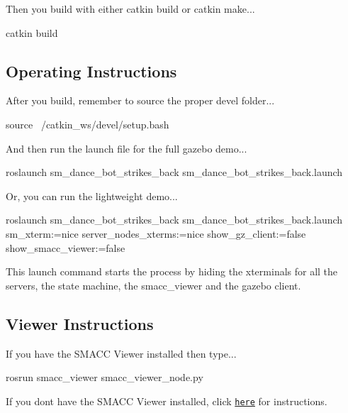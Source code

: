 Then you build with either catkin build or catkin make...


\begin{DoxyCode}
catkin build
\end{DoxyCode}
 \subsection*{Operating Instructions}

After you build, remember to source the proper devel folder...


\begin{DoxyCode}
source ~/catkin\_ws/devel/setup.bash
\end{DoxyCode}


And then run the launch file for the full gazebo demo...


\begin{DoxyCode}
roslaunch sm\_dance\_bot\_strikes\_back sm\_dance\_bot\_strikes\_back.launch
\end{DoxyCode}


Or, you can run the lightweight demo...


\begin{DoxyCode}
roslaunch sm\_dance\_bot\_strikes\_back sm\_dance\_bot\_strikes\_back.launch sm\_xterm:=nice
       server\_nodes\_xterms:=nice show\_gz\_client:=false show\_smacc\_viewer:=false
\end{DoxyCode}


This launch command starts the process by hiding the xterminals for all the servers, the state machine, the smacc\+\_\+viewer and the gazebo client.

\subsection*{Viewer Instructions}

If you have the S\+M\+A\+CC Viewer installed then type...


\begin{DoxyCode}
rosrun smacc\_viewer smacc\_viewer\_node.py
\end{DoxyCode}


If you don\textquotesingle{}t have the S\+M\+A\+CC Viewer installed, click \href{http://smacc.ninja/smacc-viewer/}{\tt here} for instructions. 